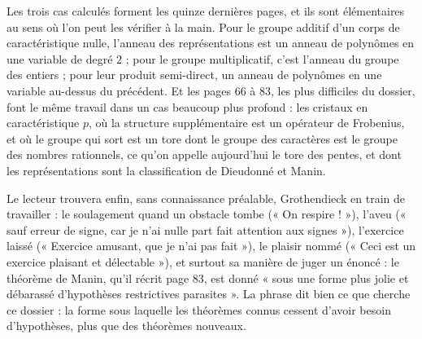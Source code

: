 \documentclass[11pt,a4paper]{article}
\begin{document}
\begin{resume}
Les trois cas calculés forment les quinze dernières pages, et ils sont
élémentaires au sens où l'on peut les vérifier à la main. Pour le groupe
additif d'un corps de caractéristique nulle, l'anneau des représentations est
un anneau de polynômes en une variable de degré $2$ ; pour le groupe
multiplicatif, c'est l'anneau du groupe des entiers ; pour leur produit
semi-direct, un anneau de polynômes en une variable au-dessus du précédent. Et
les pages 66 à 83, les plus difficiles du dossier, font le même travail dans un
cas beaucoup plus profond : les cristaux en caractéristique $p$, où la structure
supplémentaire est un opérateur de Frobenius, et où le groupe qui sort est un
tore dont le groupe des caractères est le groupe des nombres rationnels, ce
qu'on appelle aujourd'hui le tore des pentes, et dont les représentations sont
la classification de Dieudonné et Manin.

Le lecteur trouvera enfin, sans connaissance préalable, Grothendieck en
train de travailler : le soulagement quand un
obstacle tombe (« On respire ! »), l'aveu (« sauf erreur de signe, car je n'ai
nulle part fait attention aux signes »), l'exercice laissé (« Exercice amusant,
que je n'ai pas fait »), le plaisir nommé (« Ceci est un exercice plaisant et
délectable »), et surtout sa manière de juger un énoncé : le théorème de Manin,
qu'il récrit page 83, est donné « sous une forme plus jolie et débarassé
d'hypothèses restrictives parasites ». La phrase dit bien ce que cherche ce
dossier : la forme sous laquelle les théorèmes connus cessent d'avoir besoin
d'hypothèses, plus que des théorèmes nouveaux.

\end{resume}
\end{document}
